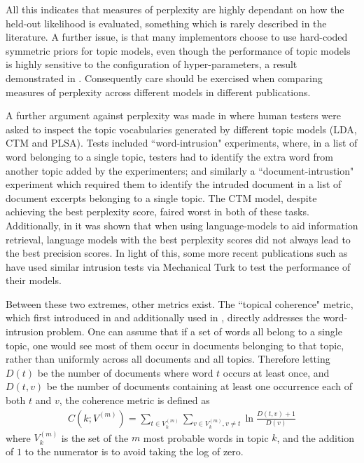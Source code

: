 All this indicates that measures of perplexity are highly dependant on how the held-out likelihood is evaluated, something which is rarely described in the literature. A further issue, is that many implementors choose to use hard-coded symmetric priors for topic models, even though the performance of topic models is highly sensitive to the configuration of hyper-parameters, a result demonstrated in \cite{Asuncion2012}\cite{Wallach2006}. Consequently care should be exercised when comparing measures of perplexity across different models in different publications.

A further argument against perplexity was made in \cite{Chang2009} where human testers were asked to inspect the topic vocabularies generated by different topic models (LDA, CTM and PLSA). Tests included ``word-intrusion" experiments, where, in a list of word belonging to a single topic, testers had to identify the extra word from another topic added by the experimenters; and similarly a ``document-intrustion" experiment which required them to identify the intruded document in a list of document excerpts belonging to a single topic. The CTM model, despite achieving the best perplexity score, faired worst in both of these tasks. Additionally, in \cite{Azzopardi2003} it was shown that when using language-models to aid information retrieval, language models with the best perplexity scores did not always lead to the best precision scores. In light of this, some more recent publications such as \cite{Li2006}\cite{Wang2007}\cite{Lindsey2012} have used similar intrusion tests via Mechanical Turk to test the performance of their models.

Between these two extremes, other metrics exist. The ``topical coherence" metric, which first introduced in \cite{Mimno2011} and additionally used in \cite{Mimno2012a}, directly addresses the word-intrusion problem. One can assume that if a set of words all belong to a single topic, one would see most of them occur in documents belonging to that topic, rather than uniformly across all documents and all topics. Therefore letting $D(t)$ be the number of documents where word $t$ occurs at least once, and $D(t,v)$ be the number of documents containing at least one occurrence each of both $t$ and $v$, the coherence metric is defined as
\begin{align}
C(k; V^{(m)}) = \sum_{t \in V^{(m)}_k} \sum_{v \in V^{(m)}_k,  v \neq t} \ln \frac{D(t, v) + 1}{D(v)}
\end{align}
where $V^{(m)}_k$ is the set of the $m$ most probable words in topic $k$, and the addition of $1$ to the numerator is to avoid taking the log of zero. 

